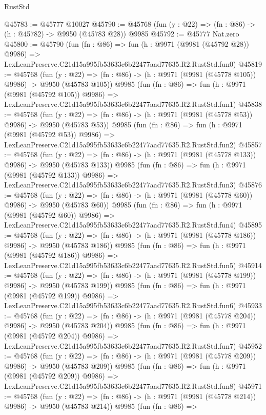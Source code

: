 \begin{lexlean}{RustStd}
\begin{coremodule}
@45783 := @45777 @10027
@45790 := @45768 (fun (y : @22) => (fn : @86) -> (h : @45782) -> @9950 (@45783 @28)) @9985
@45792 := @45777 Nat.zero
@45800 := @45790
    (fun (fn : @86) =>
    fun (h : @9971 (@9981 (@45792 @28)) @9986) =>
    LexLeanPreserve.C21d15a995fb53633c6b22477aad77635.R2.RustStd.fun0)
@45819 := @45768
    (fun (y : @22) => (fn : @86) -> (h : @9971 (@9981 (@45778 @105)) @9986) -> @9950 (@45783 @105))
    @9985
    (fun (fn : @86) =>
    fun (h : @9971 (@9981 (@45792 @105)) @9986) =>
    LexLeanPreserve.C21d15a995fb53633c6b22477aad77635.R2.RustStd.fun1)
@45838 := @45768
    (fun (y : @22) => (fn : @86) -> (h : @9971 (@9981 (@45778 @53)) @9986) -> @9950 (@45783 @53))
    @9985
    (fun (fn : @86) =>
    fun (h : @9971 (@9981 (@45792 @53)) @9986) =>
    LexLeanPreserve.C21d15a995fb53633c6b22477aad77635.R2.RustStd.fun2)
@45857 := @45768
    (fun (y : @22) => (fn : @86) -> (h : @9971 (@9981 (@45778 @133)) @9986) -> @9950 (@45783 @133))
    @9985
    (fun (fn : @86) =>
    fun (h : @9971 (@9981 (@45792 @133)) @9986) =>
    LexLeanPreserve.C21d15a995fb53633c6b22477aad77635.R2.RustStd.fun3)
@45876 := @45768
    (fun (y : @22) => (fn : @86) -> (h : @9971 (@9981 (@45778 @60)) @9986) -> @9950 (@45783 @60))
    @9985
    (fun (fn : @86) =>
    fun (h : @9971 (@9981 (@45792 @60)) @9986) =>
    LexLeanPreserve.C21d15a995fb53633c6b22477aad77635.R2.RustStd.fun4)
@45895 := @45768
    (fun (y : @22) => (fn : @86) -> (h : @9971 (@9981 (@45778 @186)) @9986) -> @9950 (@45783 @186))
    @9985
    (fun (fn : @86) =>
    fun (h : @9971 (@9981 (@45792 @186)) @9986) =>
    LexLeanPreserve.C21d15a995fb53633c6b22477aad77635.R2.RustStd.fun5)
@45914 := @45768
    (fun (y : @22) => (fn : @86) -> (h : @9971 (@9981 (@45778 @199)) @9986) -> @9950 (@45783 @199))
    @9985
    (fun (fn : @86) =>
    fun (h : @9971 (@9981 (@45792 @199)) @9986) =>
    LexLeanPreserve.C21d15a995fb53633c6b22477aad77635.R2.RustStd.fun6)
@45933 := @45768
    (fun (y : @22) => (fn : @86) -> (h : @9971 (@9981 (@45778 @204)) @9986) -> @9950 (@45783 @204))
    @9985
    (fun (fn : @86) =>
    fun (h : @9971 (@9981 (@45792 @204)) @9986) =>
    LexLeanPreserve.C21d15a995fb53633c6b22477aad77635.R2.RustStd.fun7)
@45952 := @45768
    (fun (y : @22) => (fn : @86) -> (h : @9971 (@9981 (@45778 @209)) @9986) -> @9950 (@45783 @209))
    @9985
    (fun (fn : @86) =>
    fun (h : @9971 (@9981 (@45792 @209)) @9986) =>
    LexLeanPreserve.C21d15a995fb53633c6b22477aad77635.R2.RustStd.fun8)
@45971 := @45768
    (fun (y : @22) => (fn : @86) -> (h : @9971 (@9981 (@45778 @214)) @9986) -> @9950 (@45783 @214))
    @9985
    (fun (fn : @86) =>

\end{coremodule}
\end{lexlean}
